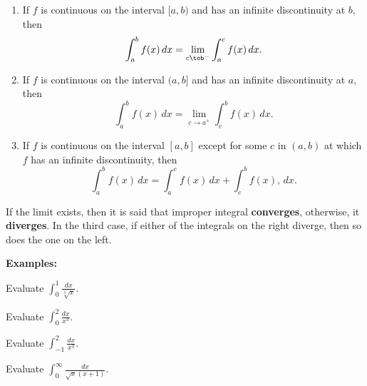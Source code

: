 \documentclass[addpoints, 12pt]{exam}
\begin{document}
\begin{tcolorbox}[title= DEFINITION OF IMPROPER INTEGRALS WITH INFINITE DISCONTINUITIES,black,sharp corners,colback=white,colbacktitle=white,coltitle=black]

    \begin{enumerate}
        \item If $f$ is continuous on the interval $[a,b)$ and has an infinite discontinuity at $b$, then 
        \[\int_a^b f(x)\,dx=\lim_{c\tob^-}\int_a^c f(x)\,dx.\]
        \item If $f$ is continuous on the interval $(a,b]$ and has an infinite discontinuity at $a$, then 
        \[\int_a^b f(x)\,dx=\lim_{c\to a^+}\int_c^b f(x)\,dx.\]
        \item If $f$ is continuous on the interval $[a,b]$ except for some $c$ in $(a,b)$ at which $f$ has an infinite discontinuity, then 
        \[\int_a^b f(x)\,dx=\int_{a}^c f(x)\,dx + \int_c^{b} f(x),\,dx.\]
    \end{enumerate}
    
    If the limit exists, then it is said that improper integral \textbf{converges}, otherwise, it \textbf{diverges}. In the third case, if either of the integrals on the right diverge, then so does the one on the left.

\end{tcolorbox}


\textbf{Examples:}
\begin{questions}
    \begin{minipage}{.45\linewidth}
        \question Evaluate $\displaystyle\int_0^1\frac{dx}{\sqrt[3]{x}}$.    
    \end{minipage}
    \hfill
    \begin{minipage}{.45\linewidth}
        \question Evaluate $\displaystyle\int_0^2\frac{dx}{x^3}$.
    \end{minipage}
    
    
    \newpage
    
    \question Evaluate $\displaystyle\int_{-1}^2\frac{dx}{x^3}$.
    
    
    
    
    \question Evaluate $\displaystyle\int_0^\infty\frac{dx}{\sqrt{x}(x+1)}.$
    
\end{questions}
\end{document}
